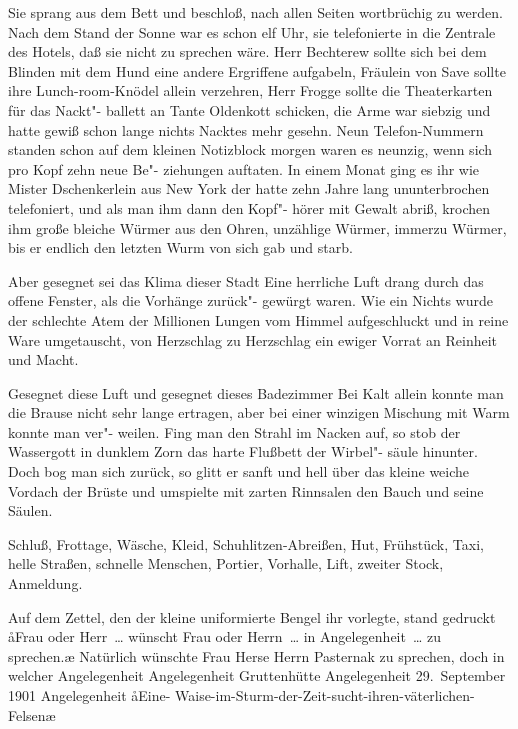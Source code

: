Sie sprang aus dem Bett und beschloß, nach allen Seiten
wortbrüchig zu werden. Nach dem Stand der Sonne war es
schon elf Uhr, sie telefonierte in die Zentrale des Hotels, daß
sie nicht zu sprechen wäre. Herr Bechterew sollte sich bei dem
Blinden mit dem Hund eine andere Ergriffene aufgabeln,
Fräulein von Save sollte ihre Lunch-room-Knödel allein
verzehren, Herr Frogge sollte die Theaterkarten für das Nackt"-%
ballett an Tante Oldenkott schicken, die Arme war siebzig und
hatte gewiß schon lange nichts Nacktes mehr gesehn. Neun
Telefon-Nummern standen schon auf dem kleinen Notizblock\dopp{}
morgen waren es neunzig, wenn sich pro Kopf zehn neue Be"-%
ziehungen auftaten. In einem Monat ging es ihr wie Mister
Dschenkerlein aus New York\dopp{} der hatte zehn Jahre lang
ununterbrochen telefoniert, und als man ihm dann den Kopf"-%
hörer mit Gewalt abriß, krochen ihm große bleiche Würmer
aus den Ohren, unzählige Würmer, immerzu Würmer, bis
er endlich den letzten Wurm von sich gab und starb.

Aber gesegnet sei das Klima dieser Stadt\ausr{} Eine herrliche Luft
drang durch das offene Fenster, als die Vorhänge zurück"-%
gewürgt waren. Wie ein Nichts wurde der schlechte Atem der
Millionen Lungen vom Himmel aufgeschluckt und in reine
Ware umgetauscht, von Herzschlag zu Herzschlag ein ewiger
Vorrat an Reinheit und Macht.

Gesegnet diese Luft und gesegnet dieses Badezimmer\ausr{} Bei
Kalt allein konnte man die Brause nicht sehr lange ertragen,
aber bei einer winzigen Mischung mit Warm konnte man ver"-%
weilen. Fing man den Strahl im Nacken auf, so stob der
Wassergott in dunklem Zorn das harte Flußbett der Wirbel"-%
säule hinunter. Doch bog man sich zurück, so glitt er sanft und
hell über das kleine weiche Vordach der Brüste und umspielte
mit zarten Rinnsalen den Bauch und seine Säulen.

Schluß, Frottage, Wäsche, Kleid, Schuhlitzen-Abreißen, Hut,
Frühstück, Taxi, helle Straßen, schnelle Menschen, Portier,
Vorhalle, Lift, zweiter Stock, Anmeldung.

Auf dem Zettel, den der kleine uniformierte Bengel ihr
vorlegte, stand gedruckt\dopp{} \aa{}Frau oder Herr~\punkte{}\ldots{}\eingriff{eS55-1}{Herr~\punkte{}\ldots{} ] Herr\punkte{}\ldots{}} wünscht
Frau oder Herrn~\punkte{}\ldots{}\eingriff{eS55-2}{Herrn~\punkte{}\ldots{} ] Herrn\punkte{}\ldots{}} in Angelegenheit~\punkte{}\ldots{}\eingriff{eS55-3}{Angelegenheit~\punkte{}\ldots{} ] Angelegenheit\punkte{}\ldots{}} zu sprechen.\ae{}
Natürlich wünschte Frau Herse Herrn Pasternak zu sprechen,
doch in welcher Angelegenheit\frag{} Angelegenheit Gruttenhütte\frag{}
Angelegenheit 29.~September 1901\frag{} Angelegenheit \aa{}Eine-%
Waise-im-Sturm-der-Zeit-sucht-ihren-väterlichen-Felsen\frag{}\ae{}


